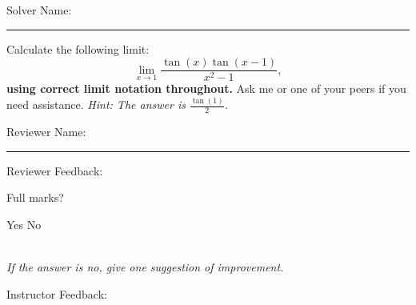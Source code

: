 \documentclass[12pt]{exam}
\begin{document}
\pagestyle{headandfoot}
\firstpageheadrule

Solver Name:\enspace\rule{5cm}{0.8pt}

\begin{questions}
\question
Calculate the following limit:
\[\lim_{x\to 1} \frac{\tan(x)\tan(x-1)}{x^2 - 1},\]
\textbf{using correct limit notation throughout.} Ask me or one of your peers if you need assistance. \textit{Hint: The answer is $\frac{\tan(1)}2$.}

\end{questions}

Reviewer Name:\enspace\rule{5cm}{0.8pt}

\begin{questions}
\question
Reviewer Feedback:

Full marks? \begin{oneparcheckboxes}
\choice Yes
\choice No
\end{oneparcheckboxes}\\
\textit{If the answer is no, give one suggestion of improvement.}

\question

Instructor Feedback:



\end{questions}
\end{document}
